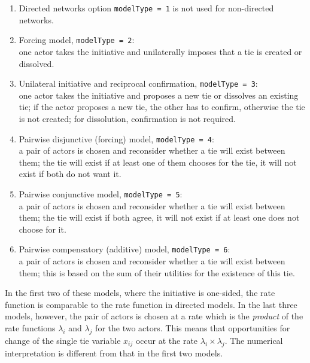 \documentclass[a4paper,fleqn,11pt]{article}
\newcommand{\+}{\, + \,}
\begin{document}

\begin{enumerate}
\item Directed networks option \texttt{modelType = 1} is not used for non-directed networks.
\item Forcing model, \texttt{modelType = 2}: \\ %
      one actor takes the initiative and unilaterally
      imposes that a tie is created or dissolved.
\item Unilateral initiative and reciprocal confirmation,
      \texttt{modelType = 3}:\\ %
      one actor takes the initiative and proposes a new tie
      or dissolves an existing tie; if the actor proposes a new tie, the other
      has to confirm, otherwise the tie is not created;
      for dissolution, confirmation is not required.

\item Pairwise disjunctive (forcing) model, \texttt{modelType = 4}:\\ %
      a pair of actors is chosen and reconsider
      whether a tie will exist between them;
      the tie will exist if at least one of them chooses for the tie,
      it will not exist if both do not want it.
\item Pairwise conjunctive model, \texttt{modelType = 5}:\\  %
      a pair of actors is chosen and reconsider
      whether a tie will exist between them;
      the tie will exist if both agree,
      it will not exist if at least one does not choose for it.
\item Pairwise compensatory (additive) model,
      \texttt{modelType = 6}:\\ %
      a pair of actors is chosen and reconsider
      whether a tie will exist between them;
      this is based on the sum of their utilities
      for the existence of this tie.
\end{enumerate}
In the first two of these models, where the initiative is one-sided,
the rate function is comparable to the rate function in directed models.
In the last three models, however, the pair of actors is chosen at a rate
which is the \emph{product} of the rate functions
$\lambda_i$ and $\lambda_j$ for the two actors.
This means that opportunities for change of the single tie variable $x_{ij}$
occur at the rate $\lambda_i \times \lambda_j$.
The numerical interpretation is different from that in the first two models.
\end{document}
